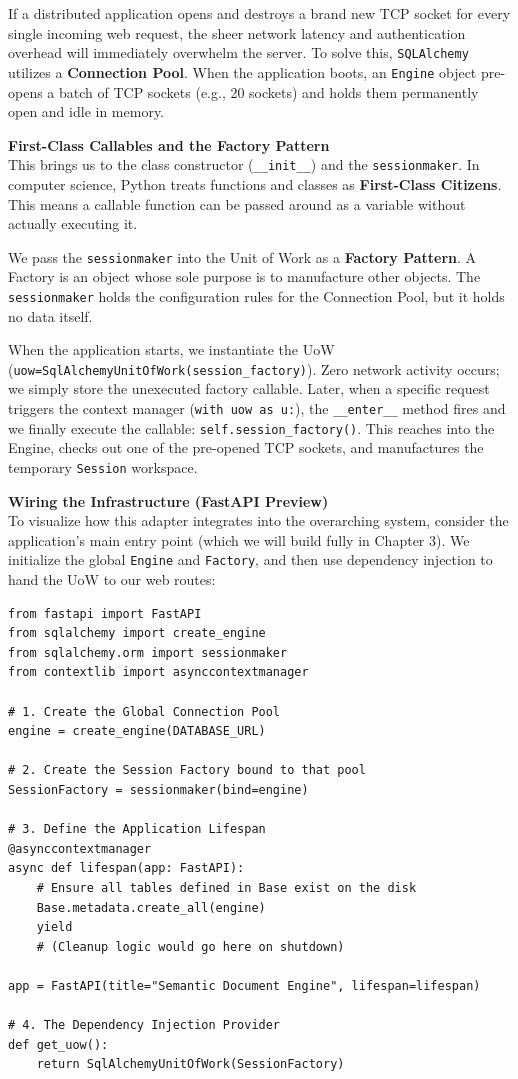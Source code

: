If a distributed application opens and destroys a brand new TCP socket for every single incoming web request, the sheer network latency and authentication overhead will immediately overwhelm the server. To solve this, \texttt{SQLAlchemy} utilizes a \textbf{Connection Pool}. When the application boots, an \texttt{Engine} object pre-opens a batch of TCP sockets (e.g., 20 sockets) and holds them permanently open and idle in memory.

\textbf{First-Class Callables and the Factory Pattern} \\
This brings us to the class constructor (\texttt{\_\_init\_\_}) and the \texttt{sessionmaker}. In computer science, Python treats functions and classes as \textbf{First-Class Citizens}. This means a callable function can be passed around as a variable without actually executing it.

We pass the \texttt{sessionmaker} into the Unit of Work as a \textbf{Factory Pattern}. A Factory is an object whose sole purpose is to manufacture other objects. The \texttt{sessionmaker} holds the configuration rules for the Connection Pool, but it holds no data itself.

When the application starts, we instantiate the UoW (\texttt{uow=SqlAlchemy\allowbreak{}UnitOfWork(session\_factory)}). Zero network activity occurs; we simply store the unexecuted factory callable. Later, when a specific request triggers the context manager (\texttt{with uow as u:}), the \texttt{\_\_enter\_\_} method fires and we finally execute the callable: \texttt{self.session\_factory()}. This reaches into the Engine, checks out one of the pre-opened TCP sockets, and manufactures the temporary \texttt{Session} workspace.

\textbf{Wiring the Infrastructure (FastAPI Preview)} \\
To visualize how this adapter integrates into the overarching system, consider the application's main entry point (which we will build fully in Chapter 3). We initialize the global \texttt{Engine} and \texttt{Factory}, and then use dependency injection to hand the UoW to our web routes:

\begin{lstlisting}[caption={Wiring the Infrastructure in FastAPI}]
from fastapi import FastAPI
from sqlalchemy import create_engine
from sqlalchemy.orm import sessionmaker
from contextlib import asynccontextmanager

# 1. Create the Global Connection Pool
engine = create_engine(DATABASE_URL)

# 2. Create the Session Factory bound to that pool
SessionFactory = sessionmaker(bind=engine)

# 3. Define the Application Lifespan
@asynccontextmanager
async def lifespan(app: FastAPI):
    # Ensure all tables defined in Base exist on the disk
    Base.metadata.create_all(engine)
    yield
    # (Cleanup logic would go here on shutdown)

app = FastAPI(title="Semantic Document Engine", lifespan=lifespan)

# 4. The Dependency Injection Provider
def get_uow():
    return SqlAlchemyUnitOfWork(SessionFactory)
\end{lstlisting}

